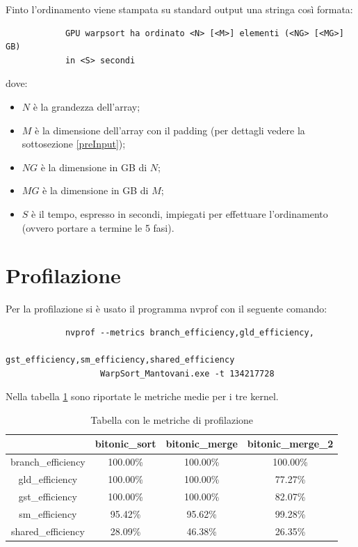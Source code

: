 \documentclass[a4paper, 11pt]{article}
\begin{document}
		Finto l'ordinamento viene stampata su standard output una stringa così formata:
		\begin{verbatim}
			GPU warpsort ha ordinato <N> [<M>] elementi (<NG> [<MG>] GB) 
			in <S> secondi
		\end{verbatim}
		dove:
		\begin{itemize}
			\item $N$ è la grandezza dell'array;
			\item $M$ è la dimensione dell'array con il padding (per dettagli vedere la sottosezione \ref{preInput});
			\item $NG$ è la dimensione in GB di $N$;
			\item $MG$ è la dimensione in GB di $M$;
			\item $S$ è il tempo, espresso in secondi, impiegati per effettuare l'ordinamento (ovvero portare a termine le 5 fasi).
		\end{itemize}	
	\section{Profilazione}
		Per la profilazione si è usato il programma nvprof con il seguente comando:
		
		\begin{verbatim}
			nvprof --metrics branch_efficiency,gld_efficiency,
			                 gst_efficiency,sm_efficiency,shared_efficiency 
			       WarpSort_Mantovani.exe -t 134217728
		\end{verbatim}
		
		Nella tabella \ref{tab:prof} sono riportate le metriche medie per i tre kernel.
		\begin{table}[h]			
			\centering
			\begin{tabular}{c|ccc}
								   & bitonic\_sort & bitonic\_merge & bitonic\_merge\_2 \\
		        \hline
				branch\_efficiency & 100.00\%      & 100.00\%       & 100.00\%          \\
				gld\_efficiency    & 100.00\%      & 100.00\%       &  77.27\%          \\
				gst\_efficiency    & 100.00\%      & 100.00\%       &  82.07\%          \\
				sm\_efficiency     &  95.42\%      &  95.62\%       &  99.28\%          \\
				shared\_efficiency &  28.09\%      &  46.38\%       &  26.35\%          \\
			\end{tabular}
			\caption{Tabella con le metriche di profilazione}
			\label{tab:prof}
			\end{table}
		
\end{document}
